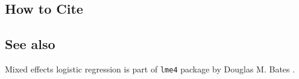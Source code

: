 \subsection* {How to Cite}




\subsection* {See also}
Mixed effects logistic regression is part of {\tt lme4} package by Douglas M. Bates \citep{Bates07}.
